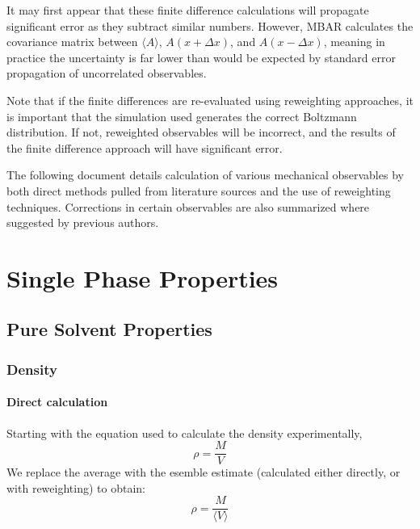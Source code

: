 \documentclass[9pt,bestpractices]{livecoms}
\begin{document}
It may first appear that these finite difference calculations will
propagate significant error as they subtract similar numbers.
However, MBAR calculates the covariance matrix between $\langle A
\rangle$, $A(x+\Delta x)$, and $A(x-\Delta x)$, meaning in practice
the uncertainty is far lower than would be expected by standard error
propagation of uncorrelated observables.


Note that if the finite differences are re-evaluated using reweighting
approaches, it is important that the simulation used generates the
correct Boltzmann distribution. If not, reweighted observables will be
incorrect, and the results of the finite difference approach will have
significant error.

The following document details calculation of various mechanical observables
by both direct methods pulled from literature sources and the use of 
reweighting techniques. Corrections in certain observables are also summarized
where suggested by previous authors. 



\section{Single Phase Properties}
\subsection{Pure Solvent Properties}
\subsubsection{Density}
\paragraph{Direct calculation}
Starting with the equation used to calculate the density experimentally, 
\begin{equation} \rho = \frac{M}{V} \end{equation}
We replace the average with the esemble estimate (calculated either directly, or with reweighting) to obtain: 
\begin{equation} \rho = \frac{M}{\langle V \rangle} \end{equation}
\end{document}
